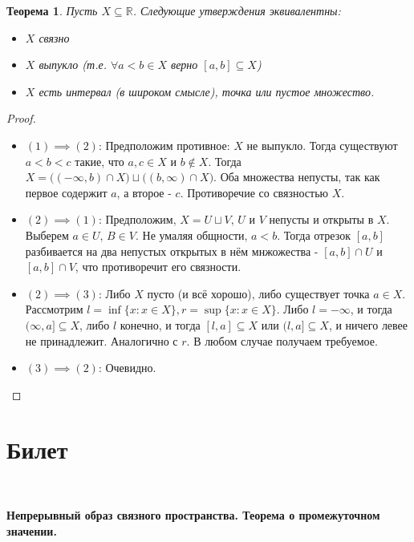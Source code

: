 \documentclass[a4paper,100pt]{article}
\theoremstyle{indented}
\newtheorem{theorem}{Теорема}
\begin{document}
\begin{theorem}
Пусть $X \subseteq \mathbb{R}$. Следующие утверждения эквивалентны:
\begin{itemize}
    \item $X$ связно
    \item $X$ выпукло (т.е. $\forall a < b \in X$ верно $[a, b] \subseteq X$)
    \item $X$ есть интервал (в широком смысле), точка или пустое множество.
\end{itemize}
\end{theorem}
\begin{proof}
~
\begin{itemize}
    \item $ (1) \implies (2)$: Предположим противное: $X$ не выпукло. Тогда существуют $a < b < c$ такие, что $a, c \in X$ и $b \notin X$. Тогда $X=\big ((-\infty, b) \cap X \big) \sqcup \big ((b, \infty) \cap X \big)$. Оба множества непусты, так как первое содержит $a$, а второе - $c$. Противоречие со связностью $X$.
    \\
    \item $ (2) \implies (1)$: Предположим, $X=U \sqcup V$, $U$ и $V$ непусты и открыты в $X$. Выберем $a \in U$, $B \in V$. Не умаляя общности, $a < b$. Тогда отрезок $[a, b]$ разбивается на два непустых открытых в нём мнжожества - $[a, b] \cap U$ и $[a, b] \cap V$, что противоречит его связности.
    \\
    \item $ (2) \implies (3)$: Либо $X$ пусто (и всё хорошо), либо существует точка $a \in X$. Рассмотрим $l=\inf\{x : x \in X\}, r=\sup\{x : x \in X\}$. Либо $l=-\infty$, и тогда $(\infty, a] \subseteq X$, либо $l$ конечно, и тогда $[l, a] \subseteq X$ или $(l, a] \subseteq X$, и ничего левее не принадлежит. Аналогично с $r$. В любом случае получаем требуемое.
    \\
    \item $ (3) \implies (2)$: Очевидно.
\end{itemize}
\end{proof}

\section{Билет} \

\medskip

\textbf{Непрерывный образ связного пространства. Теорема о промежуточном значении.}\\
\end{document}
